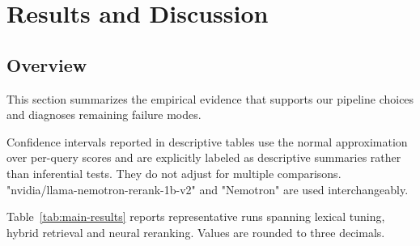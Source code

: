 \section{Results and Discussion}\label{sec:results}

\subsection{Overview}
This section summarizes the empirical evidence that supports our pipeline choices and diagnoses remaining failure modes. 

Confidence intervals reported in descriptive tables use the normal approximation over per-query scores and are explicitly labeled as descriptive
summaries rather than inferential tests. They do not adjust for multiple comparisons. "nvidia/llama-nemotron-rerank-1b-v2" and "Nemotron" are used interchangeably.

Table~\ref{tab:main-results} reports representative runs spanning lexical tuning, hybrid retrieval and neural reranking. Values are rounded to three decimals. 

